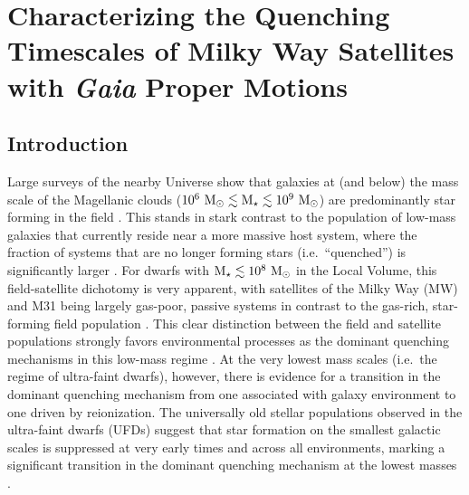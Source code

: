 \chapter{Characterizing the Quenching Timescales of Milky Way Satellites with \emph
  {Gaia} Proper Motions}


\section{Introduction}
\label{sec:intro} 


Large surveys of the nearby Universe show that galaxies at (and below) the mass
scale of the Magellanic clouds
($10^{6}~{\rm M}_{\odot} \lesssim {\rm M}_{\star} \lesssim 10^{9}~{\rm M}_{\odot}$) are predominantly star
forming in the field \citep{haines08, geha12}.
%
This stands in stark contrast to the population of low-mass galaxies that
currently reside near a more massive host system, where the fraction of systems
that are no longer forming stars (i.e.~``quenched'') is significantly larger 
\citep{geha12, wheeler14, phillips15a}.
%
For dwarfs with $\mstar \lesssim 10^{8}~\msun$ in the Local Volume, this
field-satellite dichotomy is very apparent, with satellites of the Milky Way
(MW) and M31 being largely gas-poor, passive systems in contrast to the
gas-rich, star-forming field population \citep[e.g.][]{mateo98, grcevich09,
  spekkens14}.
%
This clear distinction between the field and satellite populations strongly
favors environmental processes as the dominant quenching mechanisms in this
low-mass regime \citep[$\mstar \lesssim 10^{8}~\msun$,][]{lin83, slater14,
  weisz15, wetzel15b, fham15, fham16, fham18}.
%
At the very lowest mass scales (i.e.~the regime of ultra-faint dwarfs), however,
there is evidence for a transition in the dominant quenching mechanism from one
associated with galaxy environment to one driven by reionization. 
%
The universally old stellar populations observed in the ultra-faint dwarfs
(UFDs) suggest that star formation on the smallest galactic scales is suppressed
at very early times and across all environments, marking a significant
transition in the dominant quenching mechanism at the lowest masses
\citep{brown14, wimberly19}.
%



